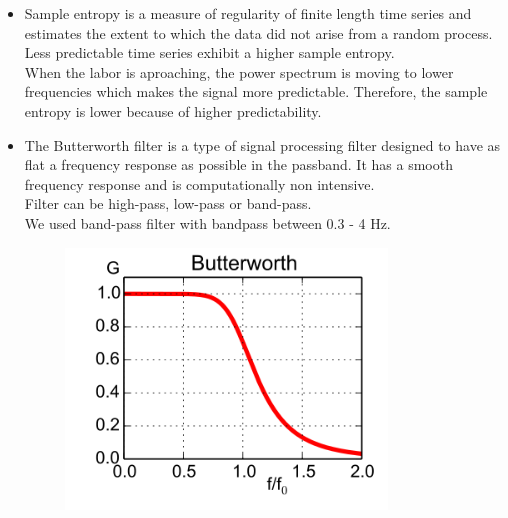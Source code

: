 \documentclass[a4paper,10pt]{article}
\begin{document}
\begin{itemize}
\item{Sample entropy is a measure of regularity of finite length time series and estimates the extent to which the data did not arise from a random process. Less predictable time series exhibit a higher sample entropy. \\  When the labor is aproaching, the power spectrum is moving to lower frequencies which makes the signal more predictable. Therefore, the sample entropy is lower because of higher predictability.}
\item{The Butterworth filter is a type of signal processing filter designed to have as flat a frequency response as possible in the passband. It has a smooth frequency response
and is computationally non intensive.\\ Filter can be high-pass, low-pass or band-pass. \\
We used band-pass filter with bandpass between 0.3 - 4 Hz.}
\begin{figure}[H]
\includegraphics{butter}
\end{figure}
\end{itemize}
\end{document}
